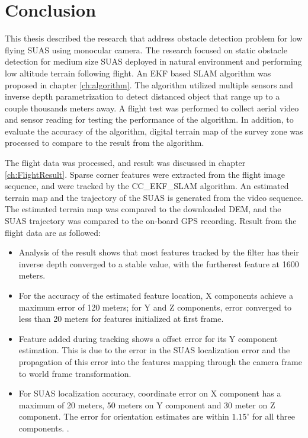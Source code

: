 \chapter{Conclusion}\label{ch:conclusion}

This thesis described the research that address obstacle
detection problem for low flying SUAS using monocular camera. The
research focused on static obstacle detection for medium size SUAS
deployed in natural environment and performing low altitude terrain
following flight.  An EKF based SLAM algorithm was
proposed in chapter \ref{ch:algorithm}. The algorithm utilized
multiple sensors and inverse depth parametrization to detect distanced
object that range up to a couple thousands meters away. A flight test
was performed to collect aerial video and sensor reading for testing
the performance of the algorithm. In addition, to evaluate the
accuracy of the algorithm, digital terrain map of the survey zone was
processed to compare to the result from the algorithm. 

The flight data was processed, and result was discussed in chapter
\ref{ch:FlightResult}. Sparse corner features were extracted from the
flight image sequence, and were tracked by the CC\_EKF\_SLAM
algorithm. An estimated terrain map and the trajectory of the SUAS is
generated from the video sequence. The estimated terrain map was
compared to the downloaded DEM, and the SUAS trajectory was compared
to the on-board GPS recording. Result from the flight data are as
followed:
\begin{itemize}
  \item Analysis of the result shows that most features tracked by the
  filter has their inverse depth converged to a stable value, with the
  furtherest feature at 1600 meters.
  \item For the accuracy of the estimated feature location, X
  components achieve a maximum error of 120 meters; for Y and Z
  components, error converged to less than 20 meters for features
  initialized at first frame.
  \item Feature added during tracking shows a offset error for its Y
  component estimation. This is due to the error in the SUAS
  localization error and the propagation of this error into the
  features mapping through the camera frame to world frame
  transformation.
  \item For SUAS localization accuracy, coordinate error on X
  component has a maximum of 20 meters, 50 meters on Y component and
  30 meter on Z component. The error for orientation estimates are
  within $1.15^\circ$ for all three components. .
\end{itemize}

